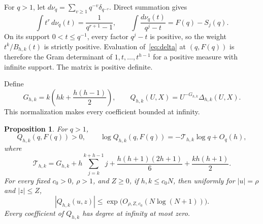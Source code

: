\documentclass[12pt]{article}
\newtheorem{proposition}[theorem]{Proposition}
\theoremstyle{remark}
\begin{document}
For $q>1$, let $d\nu_q=\sum_{v\geq1}q^{-v}\delta_{q^{-v}}$. Direct summation gives
\[
\int t^r\,d\nu_q(t)=\frac1{q^{r+1}-1},\qquad
\int\frac{d\nu_q(t)}{q^j-t}=F(q)-S_j(q).
\]
On its support $0<t\leq q^{-1}$, every factor $q^j-t$ is positive, so the
weight $t^k/B_{h,k}(t)$ is strictly positive. Evaluation of~\eqref{eq:delta} at
$(q,F(q))$ is therefore the Gram determinant of $1,t,\ldots,t^{h-1}$ for a
positive measure with infinite support. The matrix is positive definite.

Define
\begin{equation}\label{eq:normalization}
G_{h,k}=k\left(hk+\frac{h(h-1)}2\right),\qquad
Q_{h,k}(U,X)=U^{-G_{h,k}}\Delta_{h,k}(U,X).
\end{equation}
This normalization makes every coefficient bounded at infinity.

\begin{proposition}\label{prop:analytic}
For $q>1$,
\begin{equation}\label{eq:decay}
Q_{h,k}(q,F(q))>0,\qquad
\log Q_{h,k}(q,F(q))=-\mathcal T_{h,k}\log q+O_q(h),
\end{equation}
where
\begin{equation}\label{eq:T}
\mathcal T_{h,k}=G_{h,k}+h\sum_{j=k}^{k+h-1}j+
\frac{h(h+1)(2h+1)}6+\frac{k h(h+1)}2.
\end{equation}
For every fixed $c_0>0$, $\rho>1$, and $Z\geq0$, if $h,k\leq c_0N$, then uniformly
for $|u|=\rho$ and $|z|\leq Z$,
\begin{equation}\label{eq:complexQ}
|Q_{h,k}(u,z)|\leq\exp\bigl(O_{\rho,Z,c_0}(N\log(N+1))\bigr).
\end{equation}
Every coefficient of $Q_{h,k}$ has degree at infinity at most zero.
\end{proposition}
\end{document}
